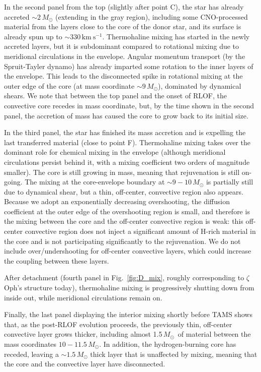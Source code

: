 \documentclass[twocolumn,twocolappendix,trackchanges]{aastex63}
\newcommand{\kms}{{\mathrm{km\ s^{-1}}}}
\DeclareRobustCommand{\Figref}[1]{Fig.~\ref{#1}}
\newcommand{\zoph}{$\zeta$ Oph}
\newcommand{\Msun}{\ensuremath{\,M_\odot}}
\begin{document}
In the second panel from the top (slightly after point C), the star has already accreted
$\sim{}2\,M_\odot$ (extending in the gray region), including some
CNO-processed material from the layers close to the core of the donor star, and its
surface is already spun up to $\sim{}330\,\kms$. Thermohaline mixing
has started in the newly accreted layers, but it is subdominant
compared to rotational mixing due to meridional circulations in the
envelope. Angular momentum transport (by the Spruit-Tayler dynamo) has
already imparted some rotation to the inner layers of the
envelope. This leads to the disconnected spike in rotational mixing at
the outer edge of the core (at mass coordinate $\sim{}9\Msun$),
dominated by dynamical shears.  We note that between the top panel and
the onset of RLOF, the convective core recedes in mass coordinate,
but, by the time shown in the second panel, the accretion of mass has
caused the core to grow back to its initial size.

In the third panel, the star has finished its mass accretion and is expelling the last transferred material (close to point F). Thermohaline mixing takes over the dominant role for chemical mixing in the
envelope (although meridional circulations persist behind it, with a
mixing coefficient two orders of magnitude smaller). The core is still
growing in mass, meaning that rejuvenation is still on-going. The
mixing at the core-envelope boundary at $\sim9-10\Msun$ is partially
still due to dynamical shear, but a thin, off-center, convective
region also appears. Because we adopt an exponentially decreasing
overshooting, the diffusion coefficient at the outer edge of the
overshooting region is small, and therefore is the mixing between the
core and the off-center convective region is weak: this off-center
convective region does not inject a significant amount of H-rich
material in the core and is not participating significantly to the
rejuvenation. We do not include
over/undershooting for off-center convective layers, which could
increase the coupling between these layers.

After detachment (fourth panel in \Figref{fig:D_mix}, roughly
corresponding to \zoph's structure today), thermohaline mixing is
progressively shutting down from inside out, while meridional
circulations remain on.

Finally, the last panel displaying the interior mixing shortly before
TAMS shows that, as the post-RLOF evolution proceeds, the previously
thin, off-center convective layer grows thicker, including almost
1.5\Msun\ of material between the mass coordinates $10-11.5\Msun$. In
addition, the hydrogen-burning core has receded, leaving a
$\sim 1.5\Msun$ thick layer that is unaffected by mixing, meaning
that the core and the convective layer have disconnected.
\end{document}
